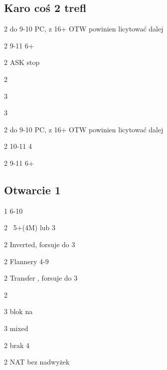 \documentclass[12pt, a4paper]{article}
\begin{document}
\subsection*{Karo coś 2 trefl}
\sequence{{1\diams}{1\hearts}{2\clubs}}
\begin{options}[2]
    \item[2\diams] do 9-10 PC, z 16+ OTW powinien licytować dalej
    \item[2\hearts] 9-11 6+\hearts\ \inv \imp
    \item[2\spades] ASK stop
    \item[2\nt] \gf
    \item[3\clubs] \inv
    \item[3\diams] \inv      
\end{options}

\sequence{{1\diams}{1\spades}{2\clubs}}
\begin{options}[2]
    \item[2\diams] do 9-10 PC, z 16+ OTW powinien licytować dalej
    \item[2\hearts] 10-11 4\spades\ \inv
    \item[2\spades] 9-11 6+\spades \inv \imp
\end{options}

\subsection*{Otwarcie 1\diams}
\sequence{{1\diams}}
\begin{options}[2]
    \item[1\nt] 6-10
    \item[2\clubs] \gf\ 5+\clubs (4M) lub 3\diams 
    \item[2\diams] Inverted, forsuje do 3\diams 
    \item[2\hearts] Flannery 4-9
    \item[2\spades] Transfer \nt, forsuje do 3\clubs \imp
    \item[2\nt] \inv   
    \item[3\clubs] blok na \diams 
    \item[3\diams] mixed 
\end{options}


\sequence{{1\diams}{2\clubs}}
\begin{options}[1]
    \item[2\diams] brak 4\major
    \item[2\major] NAT bez nadwyżek
\end{options}
\end{document}
